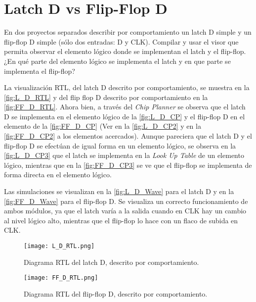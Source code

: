 \section{Latch D vs Flip-Flop D \label{sec:s4}}

\begin{center}
	\begin{minipage}{12cm}
		\begin{tcolorbox}[title=Actividad 4]
			En dos proyectos separados describir por comportamiento  un latch D simple y un flip-flop D simple (sólo dos entradas: D y CLK). Compilar y usar el visor que permita observar el elemento lógico donde se implementan el latch y el flip-flop. ¿En qué parte del elemento lógico se implementa el latch y en que parte se implementa el flip-flop?
		\end{tcolorbox}	
	\end{minipage}
\end{center}

La visualización RTL, del latch D descrito por comportamiento, se muestra en la \autoref{fig:L_D_RTL} y del flip flop D descrito por comportamiento en la \autoref{fig:FF_D_RTL}. Ahora bien, a través del \textit{Chip Planner} se observa que el latch D se implementa en el elemento lógico de la \autoref{fig:L_D_CP} y el flip-flop D en el elemento de la \autoref{fig:FF_D_CP} (Ver en la \autoref{fig:L_D_CP2} y en la \autoref{fig:FF_D_CP2} a los elementos acercados). Aunque pareciera que el latch D y el flip-flop D se efectúan de igual forma en un elemento lógico, se observa en la \autoref{fig:L_D_CP3} que el latch se implementa en la \textit{Look Up Table} de un elemento lógico, mientras que en la \autoref{fig:FF_D_CP3} se ve que el flip-flop se implementa de forma directa en el elemento lógico.

Las simulaciones se visualizan en la \autoref{fig:L_D_Wave} para el latch D y en la \autoref{fig:FF_D_Wave} para el flip-flop D. Se visualiza un correcto funcionamiento de ambos módulos, ya que el latch varía a la salida cuando en CLK hay un cambio al nivel lógico alto, mientras que el flip-flop lo hace con un flaco de subida en CLK.

\begin{figure}[ht]
	\centering
	\texttt{[image: L\_D\_RTL.png]}
	\caption{Diagrama RTL del latch D, descrito por comportamiento. \label{fig:L_D_RTL}}
\end{figure}

\begin{figure}[ht]
	\centering
	\texttt{[image: FF\_D\_RTL.png]}
	\caption{Diagrama RTL del flip-flop D, descrito por comportamiento. \label{fig:FF_D_RTL}}
\end{figure}

